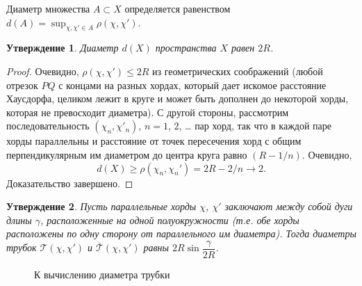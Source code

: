 \documentclass[12pt]{article}
\newtheorem{prep}{Утверждение}
\begin{document}
Диаметр множества $A\subset X$ определяется равенством
$d(A)=\sup_{\chi, \chi' \in A} \rho(\chi, \chi').$

\begin{prep}
  Диаметр $d(X)$ пространства $X$ равен $2R$.
\end{prep}

\begin{proof}
  Очевидно, $\rho(\chi, \chi')\leqslant 2R$ из геометрических соображений (любой
  отрезок $PQ$ с концами на разных хордах, который дает искомое расстояние
  Хаусдорфа, целиком лежит в круге и может быть дополнен до некоторой хорды,
  которая не превосходит диаметра). С другой стороны, рассмотрим
  последовательность $(\chi_n, \chi'_n)$, $n=1$, $2$, \ldots{} пар хорд, так что
  в каждой паре хорды параллельны и расстояние от точек пересечения хорд с общим
  перпендикулярным им диаметром до центра круга равно $(R-1/n)$. Очевидно,
  \[
    d(X)\geqslant \rho(\chi_n, \chi_n')=2R-2/n\to2.
  \]
  Доказательство завершено.
\end{proof}

\begin{prep}
  Пусть параллельные хорды $\chi$, $\chi'$ заключают между собой дуги длины
  $\gamma$, расположенные на одной полуокружности (т.е. обе хорды расположены по
  одну сторону от параллельного им диаметра). Тогда диаметры трубок
  $\mathcal T(\chi, \chi')$ и $\bar{\mathcal T}(\chi, \chi')$ равны
  $2R\sin\dfrac{\gamma}{2R}$.
\end{prep}


\begin{figure}[h]
   \centering
 \caption{\label{AZ:fig:tube-diam} К вычислению диаметра трубки}
\end{figure}
\end{document}
